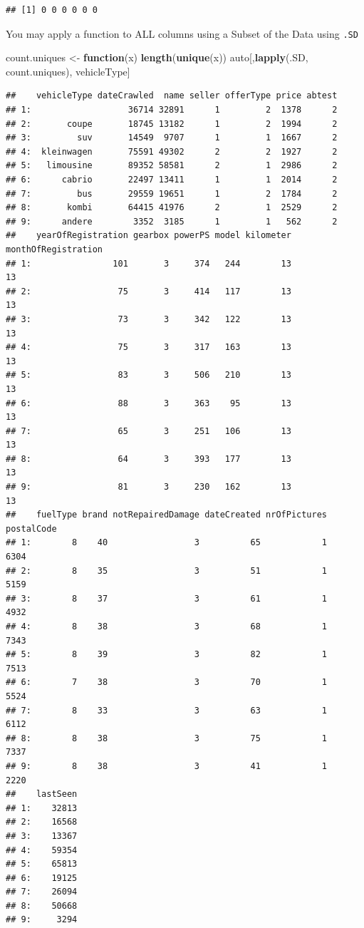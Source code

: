 \documentclass[]{book}
\newenvironment{Shaded}{\begin{snugshade}}{\end{snugshade}}
\newcommand{\KeywordTok}[1]{\textcolor[rgb]{0.13,0.29,0.53}{\textbf{#1}}}
\newcommand{\StringTok}[1]{\textcolor[rgb]{0.31,0.60,0.02}{#1}}
\newcommand{\ControlFlowTok}[1]{\textcolor[rgb]{0.13,0.29,0.53}{\textbf{#1}}}
\newcommand{\NormalTok}[1]{#1}
\theoremstyle{definition}
\theoremstyle{definition}
\theoremstyle{definition}
\theoremstyle{remark}
\begin{document}
\begin{verbatim}
## [1] 0 0 0 0 0 0
\end{verbatim}

You may apply a function to ALL columns using a Subset of the Data using
\texttt{.SD}

\begin{Shaded}
\begin{Highlighting}[]
\NormalTok{count.uniques <-}\StringTok{ }\ControlFlowTok{function}\NormalTok{(x) }\KeywordTok{length}\NormalTok{(}\KeywordTok{unique}\NormalTok{(x))}
\NormalTok{auto[,}\KeywordTok{lapply}\NormalTok{(.SD, count.uniques), vehicleType]}
\end{Highlighting}
\end{Shaded}

\begin{verbatim}
##    vehicleType dateCrawled  name seller offerType price abtest
## 1:                   36714 32891      1         2  1378      2
## 2:       coupe       18745 13182      1         2  1994      2
## 3:         suv       14549  9707      1         1  1667      2
## 4:  kleinwagen       75591 49302      2         2  1927      2
## 5:   limousine       89352 58581      2         1  2986      2
## 6:      cabrio       22497 13411      1         1  2014      2
## 7:         bus       29559 19651      1         2  1784      2
## 8:       kombi       64415 41976      2         1  2529      2
## 9:      andere        3352  3185      1         1   562      2
##    yearOfRegistration gearbox powerPS model kilometer monthOfRegistration
## 1:                101       3     374   244        13                  13
## 2:                 75       3     414   117        13                  13
## 3:                 73       3     342   122        13                  13
## 4:                 75       3     317   163        13                  13
## 5:                 83       3     506   210        13                  13
## 6:                 88       3     363    95        13                  13
## 7:                 65       3     251   106        13                  13
## 8:                 64       3     393   177        13                  13
## 9:                 81       3     230   162        13                  13
##    fuelType brand notRepairedDamage dateCreated nrOfPictures postalCode
## 1:        8    40                 3          65            1       6304
## 2:        8    35                 3          51            1       5159
## 3:        8    37                 3          61            1       4932
## 4:        8    38                 3          68            1       7343
## 5:        8    39                 3          82            1       7513
## 6:        7    38                 3          70            1       5524
## 7:        8    33                 3          63            1       6112
## 8:        8    38                 3          75            1       7337
## 9:        8    38                 3          41            1       2220
##    lastSeen
## 1:    32813
## 2:    16568
## 3:    13367
## 4:    59354
## 5:    65813
## 6:    19125
## 7:    26094
## 8:    50668
## 9:     3294
\end{verbatim}
\end{document}
